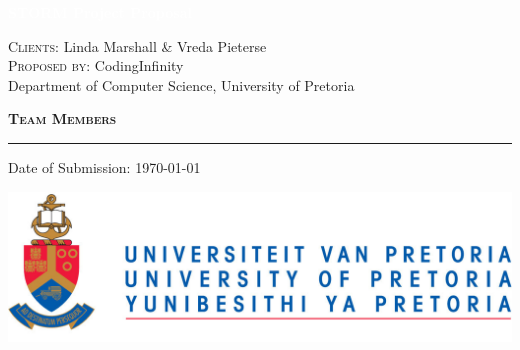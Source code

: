 \documentclass[11pt,a4paper,sans]{article}
\begin{document}
\begin{titlepage}
\BgThispage
{}
\vspace*{0.1\textheight}
\noindent
\textcolor{white}{\Huge\textbf{\textsf{STORM Project Proposal}}}
\vspace*{4cm}
\noindent
\begin{center}
			\textsc{Clients:} {\huge Linda Marshall \& Vreda Pieterse} \\
			\vspace*{0.3cm}
			\textsc{Proposed by:} {\huge CodingInfinity} \\
			\vspace*{0.1cm}
			\small Department of Computer Science, University of Pretoria \\
			\hfill
\end{center}
\vspace*{1.5cm}
\begin{minipage}{0.35\linewidth}
		\begin{center}
			\textsc{\textbf{Team Members}}
		\end{center}
    \begin{flushright}
        
    \end{flushright}
\end{minipage} \hspace{15pt}
\begin{minipage}{0.02\linewidth}
    \rule{1pt}{140pt}
\end{minipage} \hspace{-10pt}
\begin{minipage}{0.63\linewidth}
\vspace{5pt}
	\begin{abstract}
		Lecturers of the department of Computer Science at the University of Pretoria, require a system to be developed to shuffle teams. The system is going to be used by the lecturers of the Software Engineering module (COS301) to determine teams for the “Rocking the boat” exercise of the Software Engineering module using a set of lecturer defined criteria to select the teams.
	\end{abstract}
\end{minipage}

\vspace*{1cm}
{\large Date of Submission:} \today
\vfill
\begin{minipage}{\linewidth}
	\begin{center}
		\includegraphics[scale=0.3]{UP_Logo}
	\end{center}
\end{minipage}
\end{titlepage}
\restoregeometry
\end{document}
